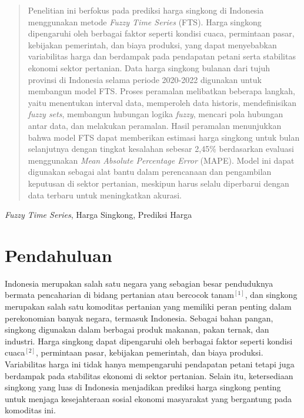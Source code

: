 \documentclass[conference]{IEEEtran}
\renewcommand{\headrulewidth}{0pt}
\renewcommand{\footrulewidth}{0.5pt}
\begin{document}
\begin{abstract}
    Penelitian ini berfokus pada prediksi harga singkong di Indonesia menggunakan metode \textit{Fuzzy Time Series} (FTS). Harga singkong dipengaruhi oleh berbagai faktor seperti kondisi cuaca, permintaan pasar, kebijakan pemerintah, dan biaya produksi, yang dapat menyebabkan variabilitas harga dan berdampak pada pendapatan petani serta stabilitas ekonomi sektor pertanian. Data harga singkong bulanan dari tujuh provinsi di Indonesia selama periode 2020-2022 digunakan untuk membangun model FTS. Proses peramalan melibatkan beberapa langkah, yaitu menentukan interval data, memperoleh data historis, mendefinisikan \textit{fuzzy sets}, membangun hubungan logika \textit{fuzzy}, mencari pola hubungan antar data, dan melakukan peramalan. Hasil peramalan menunjukkan bahwa model FTS dapat memberikan estimasi harga singkong untuk bulan selanjutnya dengan tingkat kesalahan sebesar 2,45\% berdasarkan evaluasi menggunakan \textit{Mean Absolute Percentage Error} (MAPE). Model ini dapat digunakan sebagai alat bantu dalam perencanaan dan pengambilan keputusan di sektor pertanian, meskipun harus selalu diperbarui dengan data terbaru untuk meningkatkan akurasi.
\end{abstract}

\begin{IEEEkeywords}
\textit{Fuzzy Time Series}, Harga Singkong, Prediksi Harga
\end{IEEEkeywords}

\thispagestyle{fancy}
\fancyhf{}
\fancyfoot[C]{\thepage}
\renewcommand{\headrulewidth}{0pt}
\renewcommand{\footrulewidth}{0.5pt}
\section{Pendahuluan}
Indonesia merupakan salah satu negara yang sebagian besar penduduknya bermata pencaharian di bidang pertanian atau bercocok tanam$^{[1]}$, dan singkong merupakan salah satu komoditas pertanian yang memiliki peran penting dalam perekonomian banyak negara, termasuk Indonesia. Sebagai bahan pangan, singkong digunakan dalam berbagai produk makanan, pakan ternak, dan industri.  Harga singkong dapat dipengaruhi oleh berbagai faktor seperti kondisi cuaca$^{[2]}$, permintaan pasar, kebijakan pemerintah, dan biaya produksi. Variabilitas harga ini tidak hanya mempengaruhi pendapatan petani tetapi juga berdampak pada stabilitas ekonomi di sektor pertanian. Selain itu, ketersediaan singkong yang luas di Indonesia menjadikan prediksi harga singkong penting untuk menjaga kesejahteraan sosial ekonomi masyarakat yang bergantung pada komoditas ini.
\end{document}
